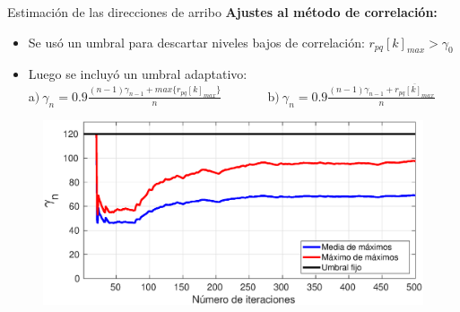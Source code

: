 \documentclass[12pt,aspectratio=169]{beamer}
\begin{document}
	\begin{frame}{Estimación de las direcciones de arribo}
	\textbf{Ajustes al método de correlación:}	
	\begin{itemize}
		\item<1-> Se usó un umbral para descartar niveles bajos de correlación: $r_{pq}[k]_{max} > \gamma_0$
		\pause
		\item<2-> Luego se incluyó un umbral adaptativo: \\
		a$)~\gamma_n = 0.9 \frac{(n-1)\gamma_{n-1} + max\{r_{pq}[k]_{max}\}}{n}$ ~~~~~~
		b$)~\gamma_n = 0.9 \frac{(n-1)\gamma_{n-1} + \overline{r_{pq}[k]_{max}}}{n}$
	\end{itemize}
	\begin{figure}[h]
		\centering
		\includegraphics[width=0.65\linewidth]{figures/threshold.eps}
	\end{figure}
	\end{frame}
	
\end{document}
